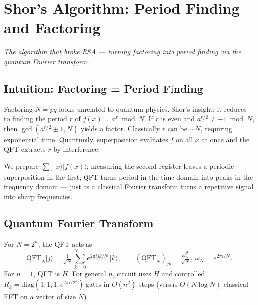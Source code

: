 \chapter{Shor's Algorithm: Period Finding and Factoring}\label{ch:shor}
\begin{center}\small\textit{The algorithm that broke RSA --- turning factoring into period finding via the quantum Fourier transform.}\end{center}

\section{Intuition: Factoring = Period Finding}
Factoring $N=pq$ looks unrelated to quantum physics. Shor's insight: it reduces to finding the period $r$ of $f(x)=a^x\bmod N$. If $r$ is even and $a^{r/2}\neq-1\bmod N$, then $\gcd(a^{r/2}\pm1,N)$ yields a factor. Classically $r$ can be $\sim N$, requiring exponential time. Quantumly, superposition evaluates $f$ on all $x$ at once and the QFT extracts $r$ by interference.

We prepare $\sum_x\lvert x\rangle\lvert f(x)\rangle$; measuring the second register leaves a periodic superposition in the first; QFT turns period in the time domain into peaks in the frequency domain --- just as a classical Fourier transform turns a repetitive signal into sharp frequencies.

\section{Quantum Fourier Transform}
For $N=2^n$, the QFT acts as
\begin{equation}
\mathrm{QFT}_N\lvert j\rangle=\tfrac1{\sqrt N}\sum_{k=0}^{N-1} e^{2\pi i jk/N}\,\lvert k\rangle,\qquad
(\mathrm{QFT}_N)_{jk}=\tfrac{\omega_N^{jk}}{\sqrt N},\ \omega_N=e^{2\pi i/N}.
\end{equation}
For $n=1$, QFT is $H$. For general $n$, circuit uses $H$ and controlled $R_k=\mathrm{diag}(1,1,1,e^{2\pi i/2^k})$ gates in $O(n^2)$ steps (versus $O(N\log N)$ classical FFT on a vector of size $N$).

